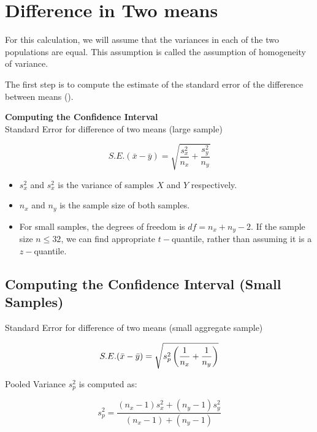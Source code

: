 \documentclass[]{report}
\begin{document}
\section{Difference in Two means}
For this calculation, we will assume that the variances in each of the two populations are equal. This assumption is called the assumption of homogeneity of variance.

The first step is to compute the estimate of the standard error of the difference between means ().




\begin{framed}
\noindent \textbf{Computing the Confidence Interval}\\ 
Standard Error for difference of two means (large sample)

\[ S.E.(\bar{x}-\bar{y}) = \sqrt{\frac{s^2_x}{n_x} + \frac{s^2_y}{n_y}} \]

\begin{itemize}
\item $s^2_x$ and $s^2_x$ is the variance of samples $X$ and $Y$ respectively.
\item $n_x$ and $n_y$ is the sample size of both samples.\bigskip

\item For small samples, the degrees of freedom is $df = n_x + n_y - 2$. If the sample size $n \leq 32$, we can find appropriate $t-$quantile, rather than assuming it is a $z-$quantile.
\end{itemize}
\end{framed}


\subsection{Computing the Confidence Interval (Small Samples)}
Standard Error for difference of two means (small aggregate sample)

\[ S.E.(\bar{x}-\bar{y}) = \sqrt{  s^2_p \left({1\over n_x}+{1\over n_y} \right)} \]

Pooled Variance $s^2_p$ is computed as:

\[ s^2_p = \frac{(n_x-1)s^2_x + (n_y-1)s^2_y}{(n_x-1) + (n_y-1)} \]





\end{document}
